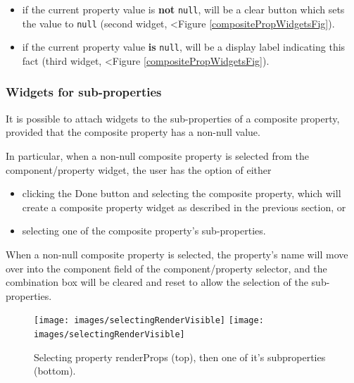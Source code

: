\documentclass{article}
\begin{document}
\begin{itemize}

\item if the current property value is {\bf not} {\tt null}, will be a 
{\sf clear} button which sets the value to {\tt null} 
(second widget, <Figure \ref{compositePropWidgetsFig}).

\item if the current property value {\bf is} {\tt null}, will be a display label
indicating this fact (third widget, <Figure \ref{compositePropWidgetsFig}).

\end{itemize}

\subsubsection{Widgets for sub-properties}

It is possible to attach widgets to the sub-properties of a 
composite property, provided that the composite property 
has a non-null value.

In particular, when a non-null composite property is selected from the
component/property widget, the user has the option of either

\begin{itemize}

\item clicking the {\sf Done} button and selecting the composite property,
which will create a composite property widget as described in the
previous section, or

\item selecting one of the composite property's sub-properties.

\end{itemize}

When a non-null composite property is selected, the property's name
will move over into the component field of the component/property
selector, and the combination box will be cleared and reset to allow
the selection of the sub-properties.

\begin{figure}
\begin{center}
\iflatexml
\texttt{[image: images/selectingRenderVisible]}
\else
\texttt{[image: images/selectingRenderVisible]}
\fi
\end{center}
\caption{Selecting property renderProps (top), then one of it's 
subproperties (bottom).}%
\label{selectingRenderPropsFig}
\end{figure}
\end{document}

